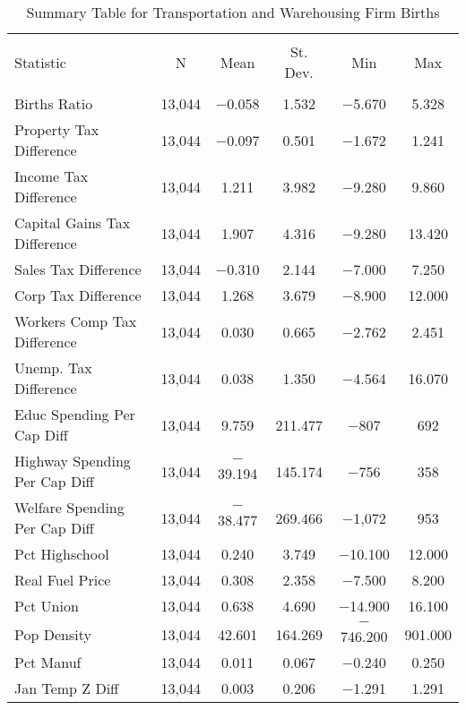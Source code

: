 
\begin{table}[!htbp] \centering 
  \caption{Summary Table for  Transportation and Warehousing Firm Births} 
  \label{48-49summary} 
\begin{tabular}{@{\extracolsep{5pt}}lccccc} 
\\[-1.8ex]\hline 
\hline \\[-1.8ex] 
Statistic & \multicolumn{1}{c}{N} & \multicolumn{1}{c}{Mean} & \multicolumn{1}{c}{St. Dev.} & \multicolumn{1}{c}{Min} & \multicolumn{1}{c}{Max} \\ 
\hline \\[-1.8ex] 
Births Ratio & 13,044 & $-$0.058 & 1.532 & $-$5.670 & 5.328 \\ 
Property Tax Difference & 13,044 & $-$0.097 & 0.501 & $-$1.672 & 1.241 \\ 
Income Tax Difference & 13,044 & 1.211 & 3.982 & $-$9.280 & 9.860 \\ 
Capital Gains Tax Difference & 13,044 & 1.907 & 4.316 & $-$9.280 & 13.420 \\ 
Sales Tax Difference & 13,044 & $-$0.310 & 2.144 & $-$7.000 & 7.250 \\ 
Corp Tax Difference & 13,044 & 1.268 & 3.679 & $-$8.900 & 12.000 \\ 
Workers Comp Tax Difference & 13,044 & 0.030 & 0.665 & $-$2.762 & 2.451 \\ 
Unemp. Tax Difference & 13,044 & 0.038 & 1.350 & $-$4.564 & 16.070 \\ 
Educ Spending Per Cap Diff & 13,044 & 9.759 & 211.477 & $-$807 & 692 \\ 
Highway Spending Per Cap Diff & 13,044 & $-$39.194 & 145.174 & $-$756 & 358 \\ 
Welfare Spending Per Cap Diff & 13,044 & $-$38.477 & 269.466 & $-$1,072 & 953 \\ 
Pct Highschool & 13,044 & 0.240 & 3.749 & $-$10.100 & 12.000 \\ 
Real Fuel Price & 13,044 & 0.308 & 2.358 & $-$7.500 & 8.200 \\ 
Pct Union & 13,044 & 0.638 & 4.690 & $-$14.900 & 16.100 \\ 
Pop Density & 13,044 & 42.601 & 164.269 & $-$746.200 & 901.000 \\ 
Pct Manuf & 13,044 & 0.011 & 0.067 & $-$0.240 & 0.250 \\ 
Jan Temp Z Diff & 13,044 & 0.003 & 0.206 & $-$1.291 & 1.291 \\ 

\end{tabular}
\end{table}

